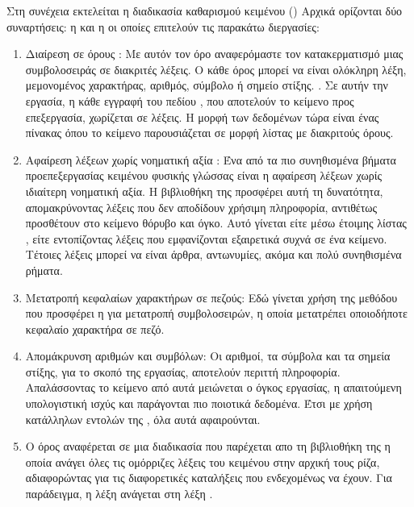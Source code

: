 Στη συνέχεια εκτελείται η διαδικασία καθαρισμού κειμένου () Αρχικά ορίζονται δύο συναρτήσεις: η  και η  οι οποίες επιτελούν τις παρακάτω διεργασίες: 
\begin{enumerate}
    \item Διαίρεση σε όρους :
    Με αυτόν τον όρο αναφερόμαστε τον κατακερματισμό μιας συμβολοσειράς σε διακριτές λέξεις. Ο κάθε όρος μπορεί να είναι ολόκληρη λέξη, μεμονομένος χαρακτήρας, αριθμός, σύμβολο ή σημείο στίξης. \cite{lemmatize}. Σε αυτήν την εργασία, η κάθε εγγραφή του πεδίου , που αποτελούν το κείμενο προς επεξεργασία, χωρίζεται σε λέξεις. Η μορφή των δεδομένων τώρα είναι ένας πίνακας όπου το κείμενο παρουσιάζεται σε μορφή λίστας με διακριτούς όρους.
    
    \item Αφαίρεση λέξεων χωρίς νοηματική αξία :
    Ένα από τα πιο συνηθισμένα βήματα προεπεξεργασίας κειμένου φυσικής γλώσσας είναι η αφαίρεση λέξεων χωρίς ιδιαίτερη νοηματική αξία. Η βιβλιοθήκη  της  προσφέρει αυτή τη δυνατότητα, απομακρύνοντας λέξεις που δεν αποδίδουν χρήσιμη πληροφορία, αντιθέτως προσθέτουν στο κείμενο θόρυβο και όγκο. Αυτό γίνεται είτε μέσω έτοιμης λίστας , είτε εντοπίζοντας λέξεις που εμφανίζονται εξαιρετικά συχνά σε ένα κείμενο. Τέτοιες λέξεις μπορεί να είναι άρθρα, αντωνυμίες, ακόμα και πολύ συνηθισμένα ρήματα.
    
    \item Μετατροπή κεφαλαίων χαρακτήρων σε πεζούς:
    Εδώ γίνεται χρήση της μεθόδου  που προσφέρει η   για μετατροπή συμβολοσειρών, η οποία μετατρέπει οποιοδήποτε κεφαλαίο χαρακτήρα σε πεζό.
    
    \item Απομάκρυνση αριθμών και συμβόλων:
    Οι αριθμοί, τα σύμβολα και τα σημεία στίξης, για το σκοπό της εργασίας, αποτελούν περιττή πληροφορία. Απαλάσσοντας το κείμενο από αυτά μειώνεται ο όγκος εργασίας, η απαιτούμενη υπολογιστική ισχύς και παράγονται πιο ποιοτικά δεδομένα. Έτσι με χρήση κατάλληλων εντολών της , όλα αυτά αφαιρούνται.
    
    \item {}
    Ο όρος  αναφέρεται σε μια διαδικασία που παρέχεται απο τη βιβλιοθήκη  της  η οποία ανάγει όλες τις ομόρριζες λέξεις του κειμένου στην αρχική τους ρίζα, αδιαφορώντας για τις διαφορετικές καταλήξεις που ενδεχομένως να έχουν. Για παράδειγμα, η λέξη  ανάγεται στη λέξη .
    

\end{enumerate}
